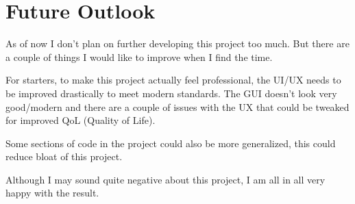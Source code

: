 \documentclass[11pt]{article}
\begin{document}
\section*{Future Outlook}

As of now I don't plan on further developing this project too much. But there are a
couple of things I would like to improve when I find the time.

For starters, to make this project actually feel professional, the UI/UX needs to be improved
drastically to meet modern standards. The GUI doesn't look very good/modern and there
are a couple of issues with the UX that could be tweaked for improved QoL (Quality of Life).

Some sections of code in the project could also be more generalized, this could reduce
bloat of this project.

Although I may sound quite negative about this project, I am all in all very happy with
the result.
\end{document}
